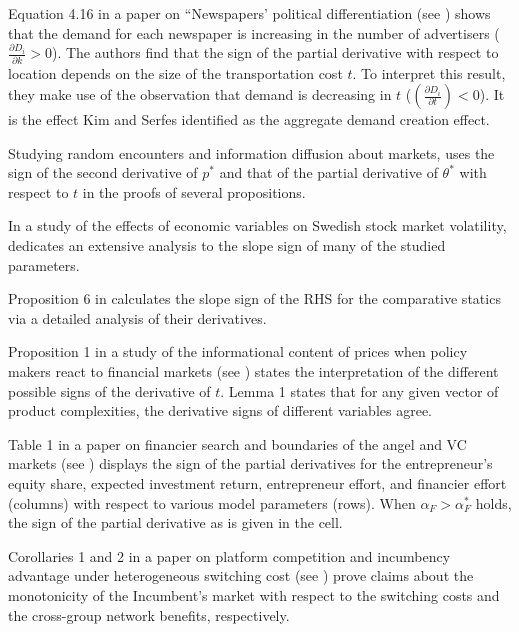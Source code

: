 \documentclass[11pt]{book}
\begin{document}
Equation 4.16 in a paper on “Newspapers’ political differentiation (see \cite{hansen2017newspapers}) shows that the demand
for each newspaper is increasing in the number of advertisers ($\frac{\partial D_{i}}{\partial k}>0$).
The authors find that the sign of the partial derivative with respect
to location depends on the size of the transportation cost $t$. To
interpret this result, they make use of the observation that demand
is decreasing in $t$ ($\left(\frac{\partial D_{i}}{\partial t}\right)<0$).
It is the effect Kim and Serfes identified as the aggregate demand
creation effect.

Studying random encounters and
information diffusion about markets, \cite{gabszewicz2018random} uses the sign of the second derivative of $p^{*}$ and that of the partial
derivative of $\theta^{*}$ with respect to $t$ in the proofs
of several propositions.

In a study of the effects of economic variables on Swedish stock market volatility, \cite{kejlberg2018effects}
dedicates an extensive analysis to the slope sign of many of the studied parameters.

Proposition 6 in \cite{siemroth2019informational} calculates the
slope sign of the RHS for the comparative statics via a detailed analysis
of their derivatives.

Proposition 1 in a study of the informational content of prices when policy makers react to
financial markets (see \cite{oehmke2019tragedy}) states the interpretation
of the different possible signs of the derivative of $t$. Lemma 1
states that for any given vector of product complexities, the derivative
signs of different variables agree.

Table 1 in a paper on financier search and boundaries of the angel and VC markets (see \cite{pandher2019financier}) displays the sign of the partial
derivatives for the entrepreneur's equity share, expected investment
return, entrepreneur effort, and financier effort (columns) with respect
to various model parameters (rows). When $\alpha_{F}>\alpha_{F}^{*}$
holds, the sign of the partial derivative as is given in the cell.

Corollaries 1 and 2 in a paper on platform competition and incumbency advantage
under heterogeneous switching cost (see \cite{siciliani2019platform}) prove claims
about the monotonicity of the Incumbent's market with respect to the
switching costs and the cross-group network benefits, respectively.
\end{document}
